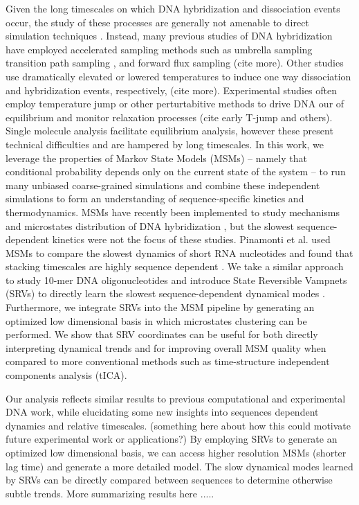 \documentclass[journal=jpcbfk,manuscript=article]{achemso}
\begin{document}
Given the long timescales on which DNA hybridization and dissociation events occur, the study of these processes are generally not amenable to direct simulation techniques \citep{Phys2014}. Instead, many previous studies of DNA hybridization have employed accelerated sampling methods such as umbrella sampling \citep{Schmitt2013ExploringSurface} transition path sampling \citep{Sambriski2009}, \citep{Hoefert2011MolecularOligonucleotides}  and forward flux sampling  \citep{Phys2014} (cite more). Other studies use dramatically elevated or lowered temperatures to induce one way dissociation and hybridization events, respectively, \citep{Wong2008TheSimulations} (cite more). Experimental studies often employ temperature jump or other perturtabitive methods to drive DNA our of equilibrium and monitor relaxation processes (cite early T-jump and others). Single molecule analysis facilitate equilibrium analysis, however these present technical difficulties and are hampered by long timescales. In this work, we leverage the properties of Markov State Models (MSMs) -- namely that conditional probability depends only on the current state of the system \citep{Pande2010EverythingAsk}--  to run many unbiased coarse-grained simulations and combine these independent simulations to form an understanding of sequence-specific kinetics and thermodynamics. MSMs have recently been implemented to study mechanisms and microstates distribution of DNA hybridization  \citep{Jin2019} \citep{Xiao2019}, but the slowest sequence-dependent kinetics were not the focus of these studies. Pinamonti et al. used MSMs to compare the slowest dynamics of short RNA nucleotides and found that stacking timescales are highly sequence dependent \citep{Pinamonti2017}. We take a similar approach to study 10-mer DNA oligonucleotides and introduce State Reversible Vampnets (SRVs) to directly learn the slowest sequence-dependent dynamical modes \citep{Chen}. Furthermore, we integrate SRVs into the MSM pipeline by generating an optimized low dimensional basis in which microstates clustering can be performed. We show that SRV coordinates can be useful for both directly interpreting dynamical trends and for improving overall MSM quality when compared to more conventional methods such as time-structure independent components analysis (tICA).

Our analysis reflects similar results to previous computational and experimental DNA work, while elucidating some new insights into sequences dependent dynamics and relative timescales. (something here about how this could motivate future experimental work or applications?) By employing SRVs to generate an optimized low dimensional basis, we can access higher resolution MSMs (shorter lag time) and generate a more detailed model. The slow dynamical modes learned by SRVs can be directly compared between sequences to determine otherwise subtle trends. More summarizing results here ..... 
\end{document}
